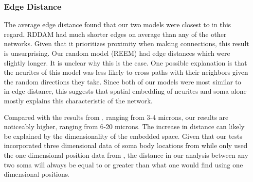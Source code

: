 \subsubsection{Edge Distance} 
The average edge distance found that our two models were closest to \ce in this regard. 
RDDAM had much shorter edges on average than any of the other networks. 
Given that it prioritizes proximity when making connections, this result is unsurprising. 
Our random model (REEM) had edge distances which were slightly longer. 
It is unclear why this is the case. 
One possible explanation is that the neurites of this model was less likely to cross paths with their neighbors given the random directions they take.
Since both of our models were most similar to \ce in edge distance, this suggests that spatial embedding of neurites and soma alone mostly explains this characteristic of the network. 

Compared with the results from \cite{Itzhack}, ranging from 3-4 microns, our results are noticeably higher, ranging from 6-20 microns. 
The increase in distance can likely be explained by the dimensionality of the embedded space. 
Given that our tests incorporated three dimensional data of soma body locations from \cite{Skuhersky} while \cite{Itzhack} only used the one dimensional position data from \cite{WormAtlas2009}, the distance in our analysis between any two soma will always be equal to or greater than what one would find using one dimensional positions.


